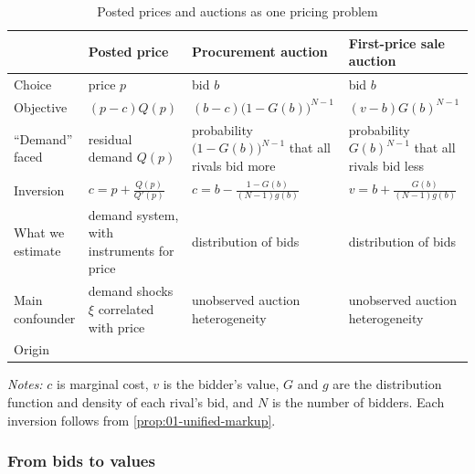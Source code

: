 \begin{table}[htbp]
\centering
\caption{Posted prices and auctions as one pricing problem}
\label{tab:01-unified}
\footnotesize
\begin{tabularx}{\textwidth}{@{}>{\raggedright\arraybackslash}p{2.35cm}
  >{\raggedright\arraybackslash}X >{\raggedright\arraybackslash}X >{\raggedright\arraybackslash}X@{}}
\toprule
 & Posted price & Procurement auction & First-price sale auction \\
\midrule
Choice & price $p$ & bid $b$ & bid $b$ \\
Objective & $(p - c)Q(p)$ & $(b - c)\big(1 - G(b)\big)^{N-1}$ & $(v - b)G(b)^{N-1}$ \\
``Demand'' faced & residual demand $Q(p)$ & probability $\big(1 - G(b)\big)^{N-1}$ that all rivals bid more &
  probability $G(b)^{N-1}$ that all rivals bid less \\
Inversion & $c = p + \frac{Q(p)}{Q'(p)}$ & $c = b - \frac{1 - G(b)}{(N - 1)g(b)}$ &
  $v = b + \frac{G(b)}{(N - 1)g(b)}$ \\
What we estimate & demand system, with instruments for price & distribution of bids &
  distribution of bids \\
Main confounder & demand shocks $\xi$ correlated with price & unobserved auction heterogeneity &
  unobserved auction heterogeneity \\
Origin & \citet{Rosse1970} & \citet{GuerrePerrigneVuong2000} & \citet{GuerrePerrigneVuong2000} \\
\bottomrule
\end{tabularx}
\par\smallskip
\begin{minipage}{\textwidth}\footnotesize
\textit{Notes:} $c$ is marginal cost, $v$ is the bidder's value, $G$ and $g$ are the distribution function
and density of each rival's bid, and $N$ is the number of bidders. Each inversion follows from
\cref{prop:01-unified-markup}.
\end{minipage}
\end{table}

\subsubsection{From bids to values}

